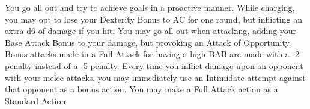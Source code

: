 \combatfeat
{You go all out and try to achieve goals in a proactive manner.}
{While charging, you may opt to lose your Dexterity Bonus to AC for one round, but inflicting an extra d6 of damage if you hit.}
{You may go all out when attacking, adding your Base Attack Bonus to your damage, but provoking an Attack of Opportunity.}
{Bonus attacks made in a Full Attack for having a high BAB are made with a -2 penalty instead of a -5 penalty.}
{Every time you inflict damage upon an opponent with your melee attacks, you may immediately use an Intimidate attempt against that opponent as a bonus action.}
{You may make a Full Attack action as a Standard Action.}
